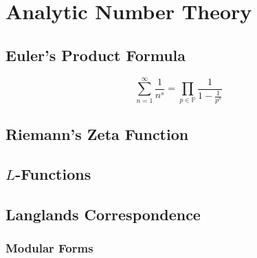 \section{Analytic Number Theory}


\subsection{Euler's Product Formula}

\begin{equation}
\sum_{n=1}^{\infty} \frac{1}{n^s} = \prod_{p \in \mathbb{P}} \frac{1}{1 - \frac{1}{p^s}}
\end{equation}


\subsection{Riemann's Zeta Function}

\subsection{$L$-Functions}

\subsection{Langlands Correspondence}


\subsubsection{Modular Forms}




\begin{comment}

A crazy result using Euler's Product Formula
https://www.youtube.com/watch?v=tSfNNXCBGrs

\end{comment}